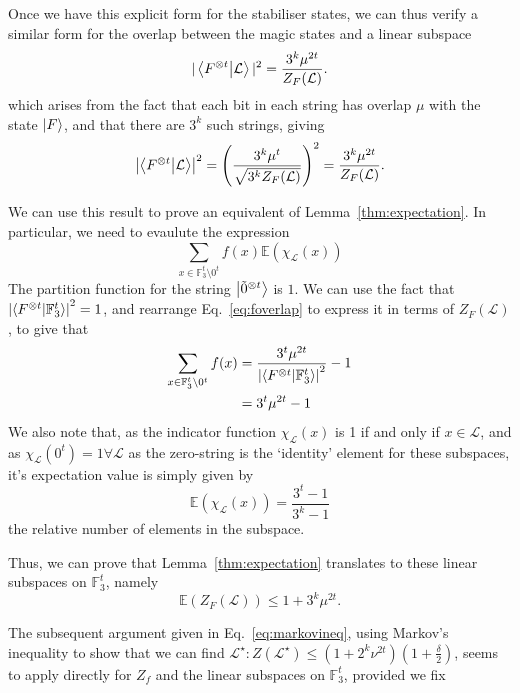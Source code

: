 \documentclass{standalone}
\begin{document}
Once we have this explicit form for the stabiliser states, we can thus verify a similar form for the overlap between the magic states and a linear subspace
\begin{equation}\label{eq:foverlap}
\vert\braket{F^{\otimes t}}{\mathcal{L}}\vert^{2}=\frac{3^{k}\mu^{2t}}{Z_{F}(\mathcal{L})}.
\end{equation}
which arises from the fact that each bit in each string has overlap $\mu$ with the state $\ket{F}$, and that there are $3^{k}$ such strings, giving 
\[\left|\braket{F^{\otimes t}}{\mathcal{L}}\right|^{2}=\left(\frac{3^{k}\mu^{t}}{\sqrt{3^{k}Z_{F}(\mathcal{L})}}\right)^{2}=\frac{3^{k}\mu^{2t}}{Z_{F}(\mathcal{L})}.\]
\par
We can use this result to prove an equivalent of Lemma~\ref{thm:expectation}. In particular, we need to evaulute the expression
\[\sum_{x\in\mathbb{F}_{3}^{t}\setminus 0^{t}}f(x)\mathbb{E}(\chi_{\mathcal{L}}(x))\] 
The partition function for the string $\ket{\tilde{0}^{\otimes t}}$ is $1$. We can use the fact that $\left|\braket{F^{\otimes t}}{\mathbb{F}_{3}^{t}}\right|^{2}=1$, and rearrange Eq.~\ref{eq:foverlap} to express it in terms of $Z_{F}(\mathcal{L})$, to give that
\begin{align}
\begin{split}
\sum_{x\in\mathbb{F}_{3}^{t}\setminus 0^{t}}f(x) &= 
\frac{3^{t}\mu^{2t}}{\left|\braket{F^{\otimes t}}{\mathbb{F}_{3}^{t}}\right|^{2}} - 1\\
&= 3^{t}\mu^{2t}-1
\end{split}
\end{align}
We also note that, as the indicator function $\chi_{\mathcal{L}}(x)$ is 1 if and only if $x\in\mathcal{L}$, and as $\chi_{\mathcal{L}}(0^{t})=1\forall\mathcal{L}$ as the zero-string is the `identity' element for these subspaces, it's expectation value is simply given by
\begin{equation}
\mathbb{E}\left(\chi_{\mathcal{L}}(x)\right)=\frac{3^{t}-1}{3^{k}-1}
\end{equation}
the relative number of elements in the subspace. 
\par
Thus, we can prove that Lemma~\ref{thm:expectation} translates to these linear subspaces on $\mathbb{F}_{3}^{t}$, namely
\begin{equation}
\mathbb{E}\left( Z_{F}(\mathcal{L}) \right)\leq 1+3^{k}\mu^{2t}.
\end{equation}
\par
The subsequent argument given in Eq.~\ref{eq:markovineq}, using Markov's inequality to show that we can find $\mathcal{L}^{\star}:Z\left(\mathcal{L}^{\star}\right)\leq(1+2^{k}\nu^{2t})\left(1+\frac{\delta}{2}\right)$, seems to apply directly for $Z_{f}$ and the linear subspaces on $\mathbb{F}_{3}^{t}$, provided we fix
\end{document}

